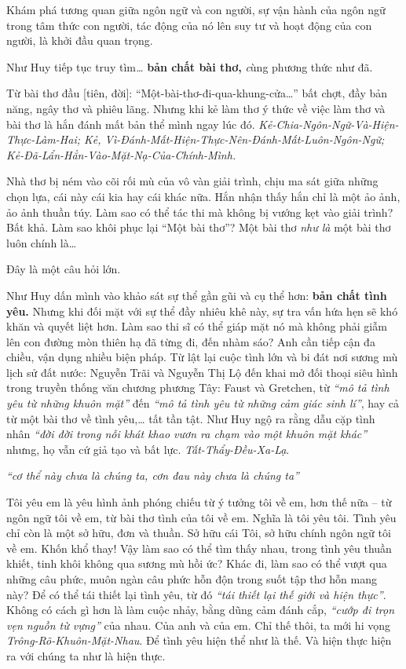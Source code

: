 \documentclass[../main.tex]{subfiles}
\begin{document}
\begin{multicols}{2}
Khám phá tương quan giữa ngôn ngữ và con người, sự vận hành của ngôn ngữ trong tâm thức con người, tác động của nó lên suy tư và hoạt động của con người, là khởi đầu quan trọng.  
 
Như Huy tiếp tục truy tìm\textit{… }\textbf{bản chất bài thơ,}\textit{ c}ùng phương thức như đã.  
 
Từ bài thơ đầu [tiên, đời]: “Một-bài-thơ-đi-qua-khung-cửa…” bất chợt, đầy bản năng, ngây thơ và phiêu lãng. Nhưng khi kẻ làm thơ ý thức về việc làm thơ và bài thơ là hắn đánh mất bản thể mình ngay lúc đó.\textit{ Kẻ-Chia-Ngôn-Ngữ-Và-Hiện-Thực-Làm-Hai; Kẻ, Vì-Đánh-Mất-Hiện-Thực-Nên-Đánh-Mất-Luôn-Ngôn-Ngữ; Kẻ-Đã-Lẩn-Hẳn-Vào-Mặt-Nạ-Của-Chính-Mình.} 
 
Nhà thơ bị ném vào cõi rối mù của vô vàn giải trình, chịu ma sát giữa những chọn lựa, cái này cái kia hay cái khác nữa. Hắn nhận thấy hắn chỉ là một ảo ảnh, ảo ảnh thuần túy. Làm sao có thể tác thi mà không bị vướng kẹt vào giải trình? Bất khả. Làm sao khôi phục lại “Một bài thơ”? Một bài thơ \textit{như là} một bài thơ luôn chính là… 
 
Đây là một câu hỏi lớn. 
 
Như Huy dấn mình vào khảo sát sự thể gần gũi và cụ thể hơn: \textbf{bản chất tình yêu.} Nhưng khi đối mặt với sự thể đầy nhiêu khê này, sự tra vấn hứa hẹn sẽ khó khăn và quyết liệt hơn. Làm sao thi sĩ có thể giáp mặt nó mà không phải giẫm lên con đường mòn thiên hạ đã từng đi, đến nhàm sáo? Anh cần tiếp cận đa chiều, vận dụng nhiều biện pháp. Từ lật lại cuộc tình lớn và bi đát nơi sương mù lịch sử đất nước: Nguyễn Trãi và Nguyễn Thị Lộ đến khai mở đối thoại siêu hình trong truyền thống văn chương phương Tây: Faust và Gretchen, từ \textit{“mô tả tình yêu từ những khuôn mặt”} đến \textit{“mô tả tình yêu từ những cảm giác sinh lí”}, hay cả từ một bài thơ về tình yêu,… tất tần tật. Như Huy ngộ ra rằng dẫu cặp tình nhân\textit{ “đời đời trong nỗi khát khao vươn ra chạm vào một khuôn mặt khác”} nhưng, họ vẫn cứ giả tạo và bất lực. \textit{Tất-Thẩy-Đều-Xa-Lạ}.         
\begin{blockquote}
 
\textit{“cơ thể này chưa là chúng ta, cơn đau này chưa là chúng ta”} 

\end{blockquote}
 
Tôi yêu em là yêu hình ảnh phóng chiếu từ ý tưởng tôi về em, hơn thế nữa – từ ngôn ngữ tôi về em, từ bài thơ tình của tôi về em. Nghĩa là tôi yêu tôi. Tình yêu chỉ còn là một sở hữu, đơn và thuần. Sở hữu cái Tôi, sở hữu chính ngôn ngữ tôi về em. Khốn khổ thay! Vậy làm sao có thể tìm thấy nhau, trong tình yêu thuần khiết, tinh khôi không qua sương mù hồi ức? Khác đi, làm sao có thể vượt qua những câu phức, muôn ngàn câu phức hỗn độn trong suốt tập thơ hỗn mang này? Để có thể  tái thiết lại tình yêu, từ đó \textit{“tái thiết lại thế giới và hiện thực”}. Không có cách gì hơn là làm cuộc nhảy, bằng dũng cảm đánh cắp,\textit{ “cướp đi trọn vẹn nguồn từ vựng”} của nhau. Của anh và của em. Chỉ thế thôi, ta mới hi vọng \textit{Trông-Rõ-Khuôn-Mặt-Nhau}. Để tình yêu hiện thể như là thế. Và hiện thực hiện ra với chúng ta như là hiện thực. 
 

\end{multicols}
\end{document}
